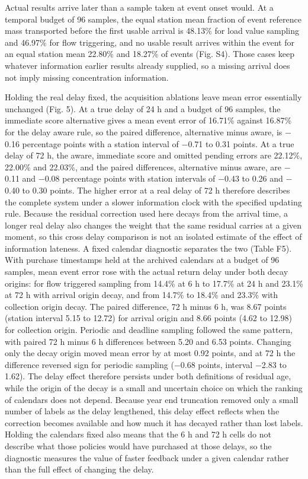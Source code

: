 \documentclass[pdflatex,sn-mathphys-num]{sn-jnl}%
\theoremstyle{thmstyleone}%
\theoremstyle{thmstyletwo}%
\theoremstyle{thmstylethree}%
\begin{document}
Actual results arrive later than a sample taken at event onset would. At a temporal budget of 96 samples, the equal station mean fraction of event reference mass transported before the first usable arrival is 48.13\% for load value sampling and 46.97\% for flow triggering, and no usable result arrives within the event for an equal station mean 22.80\% and 18.27\% of events (Fig. S4). Those cases keep whatever information earlier results already supplied, so a missing arrival does not imply missing concentration information.

Holding the real delay fixed, the acquisition ablations leave mean error essentially unchanged (Fig. 5). At a true delay of 24 h and a budget of 96 samples, the immediate score alternative gives a mean event error of 16.71\% against 16.87\% for the delay aware rule, so the paired difference, alternative minus aware, is $-$0.16 percentage points with a station interval of $-$0.71 to 0.31 points. At a true delay of 72 h, the aware, immediate score and omitted pending errors are 22.12\%, 22.00\% and 22.03\%, and the paired differences, alternative minus aware, are $-$0.11 and $-$0.08 percentage points with station intervals of $-$0.43 to 0.26 and $-$0.40 to 0.30 points. The higher error at a real delay of 72 h therefore describes the complete system under a slower information clock with the specified updating rule. Because the residual correction used here decays from the arrival time, a longer real delay also changes the weight that the same residual carries at a given moment, so this cross delay comparison is not an isolated estimate of the effect of information lateness. A fixed calendar diagnostic separates the two (Table F5). With purchase timestamps held at the archived calendars at a budget of 96 samples, mean event error rose with the actual return delay under both decay origins: for flow triggered sampling from 14.4\% at 6 h to 17.7\% at 24 h and 23.1\% at 72 h with arrival origin decay, and from 14.7\% to 18.4\% and 23.3\% with collection origin decay. The paired difference, 72 h minus 6 h, was 8.67 points (station interval 5.15 to 12.72) for arrival origin and 8.66 points (4.62 to 12.98) for collection origin. Periodic and deadline sampling followed the same pattern, with paired 72 h minus 6 h differences between 5.20 and 6.53 points. Changing only the decay origin moved mean error by at most 0.92 points, and at 72 h the difference reversed sign for periodic sampling ($-$0.68 points, interval $-$2.83 to 1.62). The delay effect therefore persists under both definitions of residual age, while the origin of the decay is a small and uncertain choice on which the ranking of calendars does not depend. Because year end truncation removed only a small number of labels as the delay lengthened, this delay effect reflects when the correction becomes available and how much it has decayed rather than lost labels. Holding the calendars fixed also means that the 6 h and 72 h cells do not describe what those policies would have purchased at those delays, so the diagnostic measures the value of faster feedback under a given calendar rather than the full effect of changing the delay.
\end{document}
